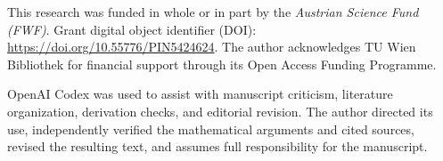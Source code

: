 \documentclass[aps,prd,twocolumn,amsmath,amssymb,nofootinbib]{revtex4-2}
\begin{document}
\begin{acknowledgments}
This research was funded in whole or in part by the \textit{Austrian Science
Fund (FWF)}.  Grant digital object identifier (DOI):
\url{https://doi.org/10.55776/PIN5424624}.
The author acknowledges TU Wien Bibliothek for financial support through its
Open Access Funding Programme.

OpenAI Codex was used to assist with manuscript criticism, literature
organization, derivation checks, and editorial revision.  The author directed
its use, independently verified the mathematical arguments and cited sources,
revised the resulting text, and assumes full responsibility for the
manuscript.
\end{acknowledgments}


\end{document}

